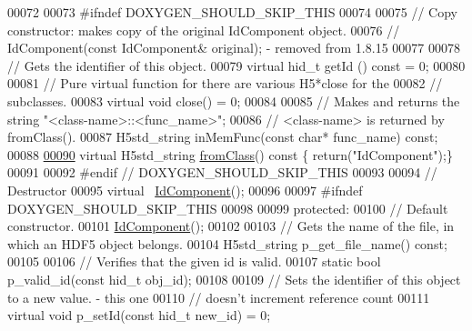 \begin{DoxyCode}
00072 
00073 \textcolor{preprocessor}{#ifndef DOXYGEN\_SHOULD\_SKIP\_THIS}
00074 
00075         \textcolor{comment}{// Copy constructor: makes copy of the original IdComponent object.}
00076         \textcolor{comment}{// IdComponent(const IdComponent& original); - removed from 1.8.15}
00077 
00078         \textcolor{comment}{// Gets the identifier of this object.}
00079         \textcolor{keyword}{virtual} hid\_t getId () \textcolor{keyword}{const} = 0;
00080 
00081         \textcolor{comment}{// Pure virtual function for there are various H5*close for the}
00082         \textcolor{comment}{// subclasses.}
00083         \textcolor{keyword}{virtual} \textcolor{keywordtype}{void} close() = 0;
00084 
00085         \textcolor{comment}{// Makes and returns the string "<class-name>::<func\_name>";}
00086         \textcolor{comment}{// <class-name> is returned by fromClass().}
00087         H5std\_string inMemFunc(\textcolor{keyword}{const} \textcolor{keywordtype}{char}* func\_name) \textcolor{keyword}{const};
00088 
\hyperlink{class_h5_1_1_id_component_a5b2f8dc9fbc2890d10c5db9ae80ddb74}{00090}         \textcolor{keyword}{virtual} H5std\_string \hyperlink{class_h5_1_1_id_component_a5b2f8dc9fbc2890d10c5db9ae80ddb74}{fromClass}()\textcolor{keyword}{ const }\{ \textcolor{keywordflow}{return}(\textcolor{stringliteral}{"IdComponent"});\}
00091 
00092 \textcolor{preprocessor}{#endif // DOXYGEN\_SHOULD\_SKIP\_THIS}
00093 
00094         \textcolor{comment}{// Destructor}
00095         \textcolor{keyword}{virtual} ~\hyperlink{class_h5_1_1_id_component}{IdComponent}();
00096 
00097 \textcolor{preprocessor}{#ifndef DOXYGEN\_SHOULD\_SKIP\_THIS}
00098 
00099     \textcolor{keyword}{protected}:
00100         \textcolor{comment}{// Default constructor.}
00101         \hyperlink{class_h5_1_1_id_component}{IdComponent}();
00102 
00103         \textcolor{comment}{// Gets the name of the file, in which an HDF5 object belongs.}
00104         H5std\_string p\_get\_file\_name() \textcolor{keyword}{const};
00105 
00106         \textcolor{comment}{// Verifies that the given id is valid.}
00107         \textcolor{keyword}{static} \textcolor{keywordtype}{bool} p\_valid\_id(\textcolor{keyword}{const} hid\_t obj\_id);
00108 
00109         \textcolor{comment}{// Sets the identifier of this object to a new value. - this one}
00110         \textcolor{comment}{// doesn't increment reference count}
00111         \textcolor{keyword}{virtual} \textcolor{keywordtype}{void} p\_setId(\textcolor{keyword}{const} hid\_t new\_id) = 0;

\end{DoxyCode}
